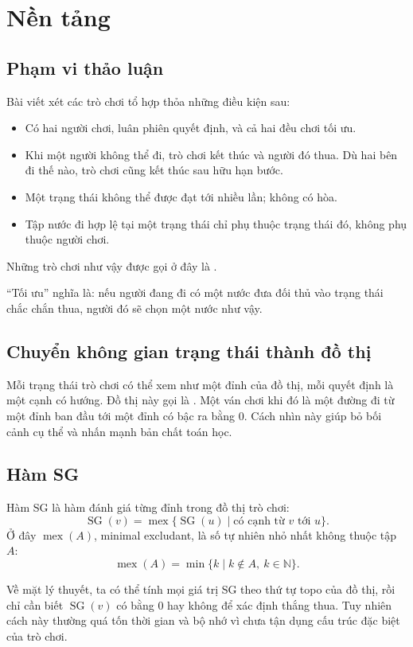 \documentclass[11pt]{article}
\newcommand{\SG}{\operatorname{SG}}
\newcommand{\mex}{\operatorname{mex}}
\begin{document}
\section{Nền tảng}

\subsection{Phạm vi thảo luận}

Bài viết xét các trò chơi tổ hợp thỏa những điều kiện sau:
\begin{itemize}
  \item Có hai người chơi, luân phiên quyết định, và cả hai đều chơi tối ưu.
  \item Khi một người không thể đi, trò chơi kết thúc và người đó thua. Dù
  hai bên đi thế nào, trò chơi cũng kết thúc sau hữu hạn bước.
  \item Một trạng thái không thể được đạt tới nhiều lần; không có hòa.
  \item Tập nước đi hợp lệ tại một trạng thái chỉ phụ thuộc trạng thái đó,
  không phụ thuộc người chơi.
\end{itemize}
Những trò chơi như vậy được gọi ở đây là .

``Tối ưu'' nghĩa là: nếu người đang đi có một nước đưa đối thủ vào trạng thái
chắc chắn thua, người đó sẽ chọn một nước như vậy.

\subsection{Chuyển không gian trạng thái thành đồ thị}

Mỗi trạng thái trò chơi có thể xem như một đỉnh của đồ thị, mỗi quyết định là
một cạnh có hướng. Đồ thị này gọi là . Một ván chơi khi
đó là một đường đi từ một đỉnh ban đầu tới một đỉnh có bậc ra bằng \(0\).
Cách nhìn này giúp bỏ bối cảnh cụ thể và nhấn mạnh bản chất toán học.

\subsection{Hàm SG}

Hàm SG là hàm đánh giá từng đỉnh trong đồ thị trò chơi:
\[
  \SG(v)=\mex\{\SG(u)\mid \text{có cạnh từ } v \text{ tới } u\}.
\]
Ở đây \(\mex(A)\), minimal excludant, là số tự nhiên nhỏ nhất không thuộc
tập \(A\):
\[
  \mex(A)=\min\{k\mid k\notin A,\ k\in\mathbb{N}\}.
\]

Về mặt lý thuyết, ta có thể tính mọi giá trị SG theo thứ tự topo của đồ thị,
rồi chỉ cần biết \(\SG(v)\) có bằng \(0\) hay không để xác định thắng thua.
Tuy nhiên cách này thường quá tốn thời gian và bộ nhớ vì chưa tận dụng cấu
trúc đặc biệt của trò chơi.
\end{document}

